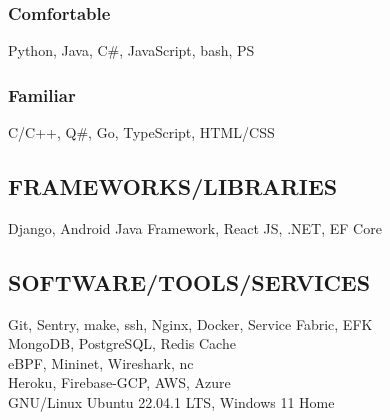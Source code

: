 \documentclass[letterpaper]{deedy-resume} %
\begin{document}
\begin{minipage}[t]{0.33\textwidth}
\subsubsection*{Comfortable}
\squeezeup
Python, Java, C\#, JavaScript, bash, PS
\subsectionspace %
\subsubsection*{Familiar}
\squeezeup
C/C++, Q\#, Go, TypeScript, HTML/CSS

\sectionspace %

\subsection{FRAMEWORKS/LIBRARIES}
Django, Android Java Framework, React JS, .NET, EF Core

\sectionspace %

\subsection{SOFTWARE/TOOLS/SERVICES}
Git, Sentry, make, ssh, Nginx, Docker, Service Fabric, EFK \\
MongoDB, PostgreSQL, Redis Cache \\
eBPF, Mininet, Wireshark, nc \\
Heroku, Firebase-GCP, AWS, Azure \\
GNU/Linux Ubuntu 22.04.1 LTS, Windows 11 Home


\sectionspace %





\end{minipage}
\end{document}
